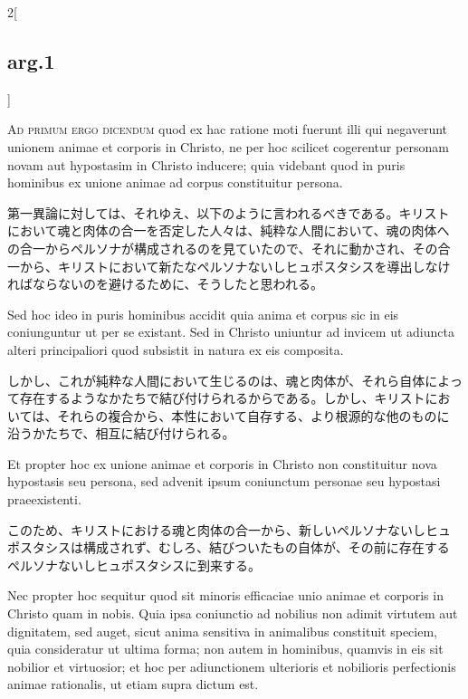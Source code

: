 \documentclass[paper=a4paper,fontsize=10pt,jafontsize=9pt,titlepage]{jlreq}
\begin{document}
\begin{paracol}{2}[\subsection{arg.1}]
\switchcolumn*[\subsection{ad.1}]

{\scshape Ad primum ergo dicendum} quod ex hac ratione moti fuerunt
illi qui negaverunt unionem animae et corporis in Christo, ne per hoc
scilicet cogerentur personam novam aut hypostasim in Christo inducere;
quia videbant quod in puris hominibus ex unione animae ad corpus
constituitur persona.

\switchcolumn

第一異論に対しては、それゆえ、以下のように言われるべきである。キリスト
において魂と肉体の合一を否定した人々は、純粋な人間において、魂の肉体へ
の合一からペルソナが構成されるのを見ていたので、それに動かされ、その合
一から、キリストにおいて新たなペルソナないしヒュポスタシスを導出しなけ
ればならないのを避けるために、そうしたと思われる。

\switchcolumn*

Sed hoc ideo in puris hominibus accidit quia anima et corpus sic in
eis coniunguntur ut per se existant. Sed in Christo uniuntur ad
invicem ut adiuncta alteri principaliori quod subsistit in natura ex
eis composita.

\switchcolumn

しかし、これが純粋な人間において生じるのは、魂と肉体が、それら自体によっ
て存在するようなかたちで結び付けられるからである。しかし、キリストにお
いては、それらの複合から、本性において自存する、より根源的な他のものに
沿うかたちで、相互に結び付けられる。

\switchcolumn*

Et propter hoc ex unione animae et corporis in Christo non
constituitur nova hypostasis seu persona, sed advenit ipsum coniunctum
personae seu hypostasi praeexistenti.

\switchcolumn

このため、キリストにおける魂と肉体の合一から、新しいペルソナないしヒュ
ポスタシスは構成されず、むしろ、結びついたもの自体が、その前に存在する
ペルソナないしヒュポスタシスに到来する。

\switchcolumn*

Nec propter hoc sequitur quod sit minoris efficaciae unio animae et
corporis in Christo quam in nobis. Quia ipsa coniunctio ad nobilius
non adimit virtutem aut dignitatem, sed auget, sicut anima sensitiva
in animalibus constituit speciem, quia consideratur ut ultima forma;
non autem in hominibus, quamvis in eis sit nobilior et virtuosior; et
hoc per adiunctionem ulterioris et nobilioris perfectionis animae
rationalis, ut etiam supra dictum est.


\end{paracol}
\end{document}
